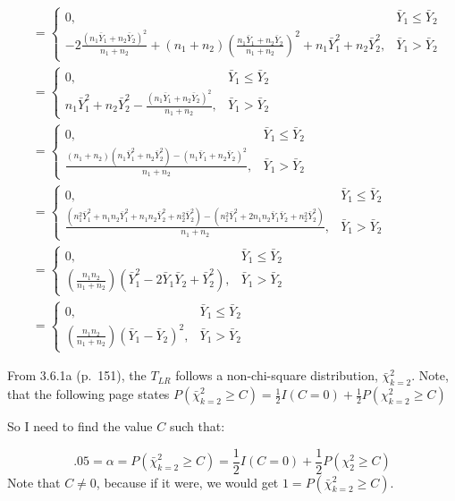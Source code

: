 \documentclass[
  letterpaper,
  DIV=11,
  numbers=noendperiod]{scrreprt}
\begin{document}
\[\begin{aligned}
&=\begin{cases} 0, & \bar Y_1 \leq \bar Y_2\\
-  2\frac{(n_1 \bar Y_1 +n_2 \bar Y _2)^2}{n_1+n_2}+(n_1+n_2)\left(\frac{n_1 \bar Y_1 +n_2 \bar Y _2}{n_1+n_2}\right)^2+  n_1 \bar Y_1^2 +n_2\bar Y_2^2 , &\bar Y_1 > \bar Y_2 \end{cases} \\
&=\begin{cases} 0, & \bar Y_1 \leq \bar Y_2\\
n_1 \bar Y_1^2 +n_2\bar Y_2^2 -  \frac{(n_1 \bar Y_1 +n_2 \bar Y _2)^2}{n_1+n_2}, &\bar Y_1 > \bar Y_2
\end{cases}\\
&=\begin{cases} 0, & \bar Y_1 \leq \bar Y_2\\
 \frac{(n_1+n_2)(n_1 \bar Y_1^2 +n_2\bar Y_2^2) -(n_1 \bar Y_1 +n_2 \bar Y _2)^2}{n_1+n_2}, &\bar Y_1 > \bar Y_2 \end{cases} \\
 &=\begin{cases} 0, & \bar Y_1 \leq \bar Y_2\\
 \frac{(n_1^2 \bar Y_1^2 + n_1n_2 \bar Y_1^2 +n_1n_2 \bar Y_2^2 +n_2^2\bar Y_2^2) -(n_1^2 \bar Y_1^2 +2n_1n_2 \bar Y_1 \bar Y_2 +n_2^2 \bar Y _2^2)}{n_1+n_2}, &\bar Y_1 > \bar Y_2 \end{cases} \\
  &=\begin{cases} 0, & \bar Y_1 \leq \bar Y_2\\
 \left(\frac{n_1n_2}{n_1+n_2}\right)(\bar Y_1^2 -2 \bar Y_1 \bar Y_2 + \bar Y_2^2), &\bar Y_1 > \bar Y_2 \end{cases} \\
  &=\begin{cases} 0, & \bar Y_1 \leq \bar Y_2\\
 \left(\frac{n_1n_2}{n_1+n_2}\right)(\bar Y_1-\bar Y_2)^2, &\bar Y_1 > \bar Y_2 \end{cases} 
\end{aligned}\]

From 3.6.1a (p.~151), the \(T_{LR}\) follows a non-chi-square
distribution, \(\bar \chi^2_{k=2}\). Note, that the following page
states
\(P(\bar \chi^2_{k=2} \geq C) = \frac 1 2 I(C=0) + \frac 1 2P(\chi^2_{k=2} \geq C)\)

So I need to find the value \(C\) such that:

\[.05 = \alpha =P(\bar \chi^2_{k=2} \geq C) = \frac 1 2 I(C=0) + \frac 1 2P(\chi^2_{2} \geq C)\]
Note that \(C \neq 0\), because if it were, we would get
\(1= P(\bar \chi^2_{k=2} \geq C)\).
\end{document}
